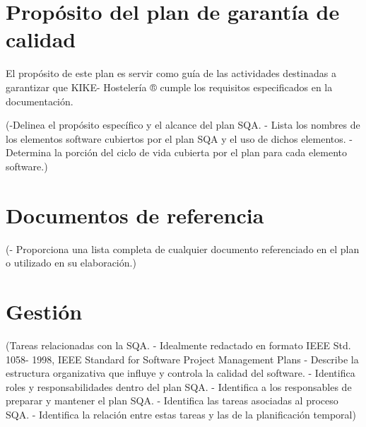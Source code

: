\documentclass[spanish,a4paper,11pt, twoside]{report}	%
\begin{document}
\newpage
\mbox{}
\thispagestyle{empty}						%
\newpage


\tableofcontents 							%

\newpage
\mbox{}
\thispagestyle{empty}						%
\newpage



\chapter{ Propósito del plan de garantía de calidad}
	El propósito de este plan es servir como guía de las actividades destinadas a garantizar que 
	KIKE- Hostelería ® cumple los requisitos especificados en la documentación.
	
	(-Delinea el propósito específico y el alcance del plan
	SQA.
	- Lista los nombres de los elementos software
	cubiertos por el plan SQA y el uso de dichos
	elementos.		
	- Determina la porción del ciclo de vida cubierta por
	el plan para cada elemento software.)

\newpage
\mbox{}
\thispagestyle{empty}						%
\newpage

\chapter{ Documentos de referencia}
	(- Proporciona una lista completa de cualquier
	documento referenciado en el plan o utilizado en su
	elaboración.)

\newpage
\mbox{}
\thispagestyle{empty}						%
\newpage

\chapter{ Gestión}
	(Tareas relacionadas con la SQA.
	- Idealmente redactado en formato IEEE Std. 1058-
	1998, IEEE Standard for Software Project
	Management Plans
	- Describe la estructura organizativa que influye y
	controla la calidad del software.
	- Identifica roles y responsabilidades dentro del plan
	SQA.
	- Identifica a los responsables de preparar y mantener
	el plan SQA.
	- Identifica las tareas asociadas al proceso SQA.
	- Identifica la relación entre estas tareas y las de la
	planificación temporal)

\newpage
\mbox{}
\thispagestyle{empty}						%
\newpage
\end{document}
